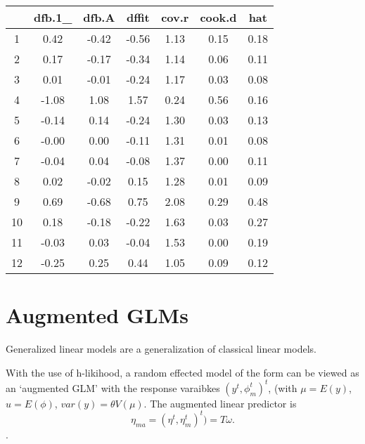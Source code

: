 \documentclass[12pt, a4paper]{article}
\begin{document}
\begin{table}[ht]
	\begin{center}
		\begin{tabular}{|c|c|c|c|c|c|c|}
			\hline
			& dfb.1\_ & dfb.A & dffit & cov.r & cook.d & hat \\
			\hline
			1 & 0.42 & -0.42 & -0.56 & 1.13 & 0.15 & 0.18 \\
			2 & 0.17 & -0.17 & -0.34 & 1.14 & 0.06 & 0.11 \\
			3 & 0.01 & -0.01 & -0.24 & 1.17 & 0.03 & 0.08 \\
			4 & -1.08 & 1.08 & 1.57 & 0.24 & 0.56 & 0.16 \\
			5 & -0.14 & 0.14 & -0.24 & 1.30 & 0.03 & 0.13 \\
			6 & -0.00 & 0.00 & -0.11 & 1.31 & 0.01 & 0.08 \\
			7 & -0.04 & 0.04 & -0.08 & 1.37 & 0.00 & 0.11 \\
			8 & 0.02 & -0.02 & 0.15 & 1.28 & 0.01 & 0.09 \\
			9 & 0.69 & -0.68 & 0.75 & 2.08 & 0.29 & 0.48 \\
			10 & 0.18 & -0.18 & -0.22 & 1.63 & 0.03 & 0.27 \\
			11 & -0.03 & 0.03 & -0.04 & 1.53 & 0.00 & 0.19 \\
			12 & -0.25 & 0.25 & 0.44 & 1.05 & 0.09 & 0.12 \\
			\hline
		\end{tabular}
	\end{center}
\end{table}




\section{Augmented GLMs} 




Generalized linear models are a generalization of classical linear  models.

With the use of h-likihood, a random effected model of the form can be viewed as an `augmented GLM' with the response varaibkes $(y^t, \phi^t_m)^t$, (with $\mu = E(y)$,$ u = E(\phi)$, $var(y) = \theta V (\mu)$.
The augmented linear predictor is \[\eta_{ma}  = (\eta^t, \eta^t_m)^t) = T\omega. \].
\end{document}
